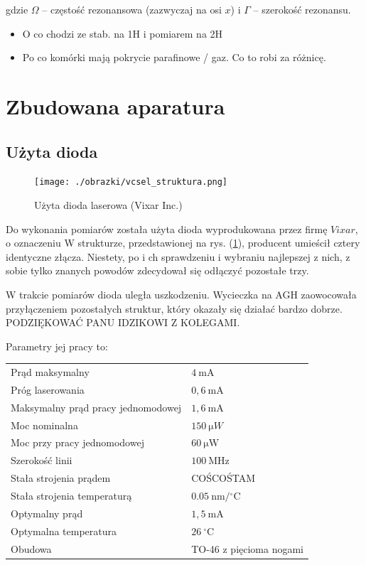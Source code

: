 \documentclass[a4paper,10pt]{article}
\begin{document}
gdzie $\Omega$ -- częstość rezonansowa (zazwyczaj na osi $x$) i $\Gamma$ -- szerokość rezonansu.\\

\begin{itemize}
 \item O co chodzi ze stab. na 1H i pomiarem na 2H
 \item Po co komórki mają pokrycie parafinowe / gaz. Co to robi za różnicę.
\end{itemize}


\pagebreak

\section{Zbudowana aparatura}

\subsection{Użyta dioda}

\begin{figure}
\begin{center}
 \texttt{[image: ./obrazki/vcsel\_struktura.png]}
\end{center}
\caption{Użyta dioda laserowa (Vixar Inc.)}
\label{struktura}
\end{figure}

Do wykonania pomiarów została użyta dioda wyprodukowana przez firmę $Vixar$, o oznaczeniu
W strukturze, przedstawionej na rys. (\ref{struktura}), producent umieścił cztery identyczne złącza. Niestety, po i ch sprawdzeniu i wybraniu najlepszej z nich, z sobie tylko znanych powodów zdecydował się odłączyć pozostałe trzy.

W trakcie pomiarów dioda uległa uszkodzeniu. Wycieczka na AGH zaowocowała przyłączeniem pozostałych struktur, który okazały się działać bardzo dobrze. PODZIĘKOWAĆ PANU IDZIKOWI Z KOLEGAMI.

Parametry jej pracy to:
\begin{center}
\begin{tabular}{ll}
Prąd maksymalny & $4 ~\mathrm{mA}$\\
Próg laserowania & $0{,}6~\mathrm{mA}$\\
Maksymalny prąd pracy jednomodowej & $1{,}6~\mathrm{mA}$\\
Moc nominalna & $150~\mathrm{\mu }W$\\
Moc przy pracy jednomodowej & $60~\mathrm{\mu W}$\\
Szerokość linii & $100~\mathrm{MHz}$\\
Stała strojenia prądem & COŚCOŚTAM\\
Stała strojenia temperaturą & $0.05 ~\mathrm{nm/{}^{\circ}C}$\\
Optymalny prąd & $1{,}5 ~\mathrm{mA}$\\
Optymalna temperatura & $26~\mathrm{ {}^{\circ}C}$ \\
Obudowa & TO-46 z pięcioma nogami
\end{tabular}
\end{center}
\end{document}
